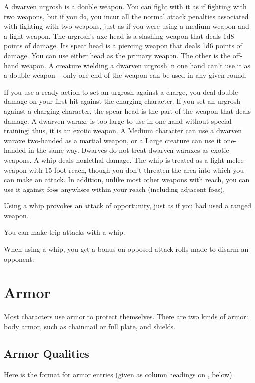  A dwarven urgrosh is a double weapon. You can fight with it as if fighting with two weapons, but if you do, you incur all the normal attack penalties associated with fighting with two weapons, just as if you were using a medium weapon and a light weapon. The urgrosh's axe head is a slashing weapon that deals 1d8 points of damage. Its spear head is a piercing weapon that deals 1d6 points of damage. You can use either head as the primary weapon. The other is the off-hand weapon. A creature wielding a dwarven urgrosh in one hand can't use it as a double weapon -- only one end of the weapon can be used in any given round.
\par If you use a ready action to set an urgrosh against a charge, you deal double damage on your first hit against the charging character. If you set an urgrosh against a charging character, the spear head is the part of the weapon that deals damage.
 A dwarven waraxe is too large to use in one hand without special training; thus, it is an exotic weapon. A Medium character can use a dwarven waraxe two-handed as a martial weapon, or a Large creature can use it one-handed in the same way. Dwarves do not treat dwarven waraxes as exotic weapons.
 A whip deals nonlethal damage. The whip is treated as a light melee weapon with 15 foot reach, though you don't threaten the area into which you can make an attack. In addition, unlike most other weapons with reach, you can use it against foes anywhere within your reach (including adjacent foes).
\par Using a whip provokes an attack of opportunity, just as if you had used a ranged weapon.
\par You can make trip attacks with a whip.
\par When using a whip, you get a  bonus on opposed attack rolls made to disarm an opponent.

\section{Armor}

Most characters use armor to protect themselves. There are two kinds of armor: body armor, such as chainmail or full plate, and shields.

\subsection{Armor Qualities}
\par Here is the format for armor entries (given as column headings on , below).

